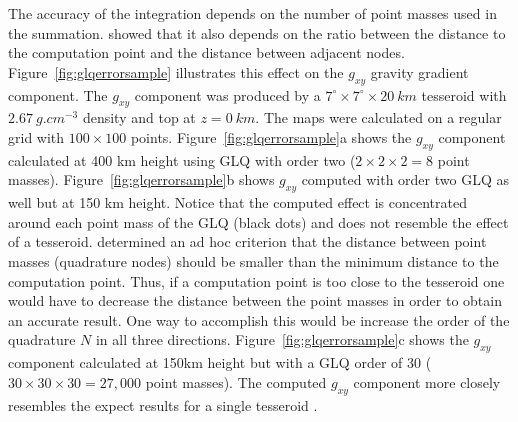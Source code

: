 \documentclass[paper,twocolumn,twoside]{geophysics}
\begin{document}
The accuracy of the integration
depends on the number of point masses used in the summation.
\citet{Ku1977} showed that it also depends on the ratio between
the distance to the computation point and the distance between adjacent nodes.
Figure~\ref{fig:glqerrorsample}
illustrates this effect on the $g_{xy}$ gravity gradient component.
The $g_{xy}$ component was produced by a
$7^\circ \times 7^\circ \times 20\ km$ tesseroid
with $2.67\ g.cm^{-3}$ density
and top at $z=0\ km$.
The maps were calculated on a regular grid
with $100\times100$ points.
Figure~\ref{fig:glqerrorsample}a shows the $g_{xy}$ component
calculated at 400 km height using
GLQ with order two ($2 \times 2 \times 2 = 8$ point masses).
Figure~\ref{fig:glqerrorsample}b shows $g_{xy}$ computed with order two
GLQ as well but at 150 km height.
Notice that the computed effect is concentrated around each point mass
of the GLQ (black dots) and does not resemble the effect of a tesseroid.
\citet{Ku1977} determined an ad hoc criterion that the distance between
point masses (quadrature nodes) should be smaller than the minimum distance to
the computation point.
Thus, if a computation point is too close to the tesseroid one would have to
decrease the distance between the point masses in order to obtain an accurate
result.
One way to accomplish this would be increase the order of the quadrature
$N$ in all three directions.
Figure~\ref{fig:glqerrorsample}c shows the $g_{xy}$ component calculated at
150km height but with a GLQ order of 30
($30 \times 30 \times 30 = 27,000$ point masses).
The computed $g_{xy}$ component more closely resembles
the expect results for a single tesseroid \citep{Asgharzadeh2007}.
\end{document}
